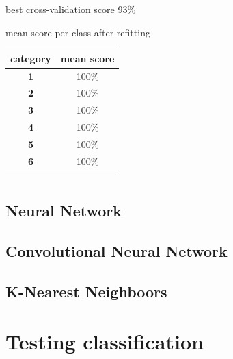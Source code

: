 \documentclass[c]{beamer}
\begin{document}
\begin{frame}
\begin{columns}[b]
\begin{column}{0.3\textwidth}
\begin{overlayarea}{\linewidth}{2cm}
 {\scriptsize
  \begin{block}{best cross-validation score}
   93\%
  \end{block}
  }
 \end{overlayarea}
 \begin{overlayarea}{\linewidth}{1cm}
  {\small
  \begin{block}{mean score per class after refitting}
   \begin{table}
    \begin{center}
    \begin{adjustbox}{max width=0.7\textwidth}
    \begin{tabular}{|c|c|}
      \hline
      \textbf{category} & \textbf{mean score}\\
      \hline
      \textbf{1} & 100\% \\
      \hline
      \textbf{2} & 100\% \\
      \hline
      \textbf{3} & 100\% \\
      \hline
      \textbf{4} & 100\% \\
      \hline
      \textbf{5} & 100\% \\
      \hline
      \textbf{6} & 100\% \\
      \hline
    \end{tabular}
    \end{adjustbox}
    \end{center}
  \end{table}
  \end{block}
  }
 \end{overlayarea}


\end{column}

\end{columns}
\end{frame}

\subsection{Neural Network}
\begin{frame}

\end{frame}

\subsection{Convolutional Neural Network}
\begin{frame}

\end{frame}

\subsection{K-Nearest Neighboors}
\begin{frame}

\end{frame}

\section{Testing classification}
\begin{frame}

\end{frame}
\end{document}
